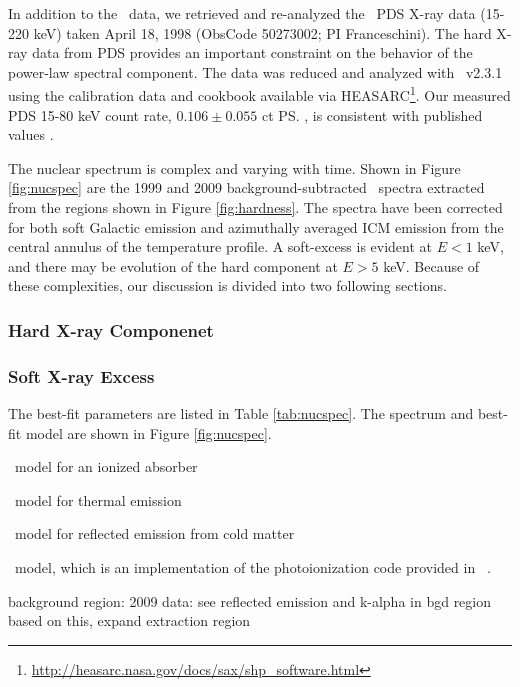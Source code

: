 \documentclass{emulateapj}
\begin{document}
In addition to the \chandra\ data, we retrieved and re-analyzed the
\bepposax\ PDS X-ray data (15-220 keV) taken April 18\ths, 1998
(ObsCode 50273002; PI Franceschini). The hard X-ray data from PDS
provides an important constraint on the behavior of the power-law
spectral component. The data was reduced and analyzed with
\saxdas\ v2.3.1 using the calibration data and cookbook available via
HEASARC\footnote{\url{http://heasarc.nasa.gov/docs/sax/shp\_software.html}}. Our
measured PDS 15-80 keV count rate, $0.106 \pm 0.055$ ct \ps, is
consistent with published values \citep{2000A&A...353..910F}.

The nuclear spectrum is complex and varying with time. Shown in Figure
\ref{fig:nucspec} are the 1999 and 2009 background-subtracted
\chandra\ spectra extracted from the regions shown in Figure
\ref{fig:hardness}. The spectra have been corrected for both soft
Galactic emission and azimuthally averaged ICM emission from the
central annulus of the temperature profile. A soft-excess is evident
at $E < 1$ keV, and there may be evolution of the hard component at $E
> 5$ keV. Because of these complexities, our discussion is divided
into two following sections.

\subsubsection{Hard X-ray Componenet}
\label{sec:hard}

\subsubsection{Soft X-ray Excess}
\label{sec:soft}

The best-fit parameters are listed in Table \ref{tab:nucspec}. The
spectrum and best-fit model are shown in Figure \ref{fig:nucspec}.

\absori\ model for an ionized absorber \citep{1992ApJ...395..275D,
  1995ApJ...438L..63Z}

\mekal\ model for thermal emission \citep{mekal1, mekal2}

\pexrav\ model for reflected emission from cold matter \citep{pexrav}

\warmabs\ model, which is an implementation of the photoionization
code provided in \xstar\ \citep{xstar1, xstar2}.

background region:
2009 data:
see reflected emission and k-alpha in bgd region
based on this, expand extraction region
\end{document}
